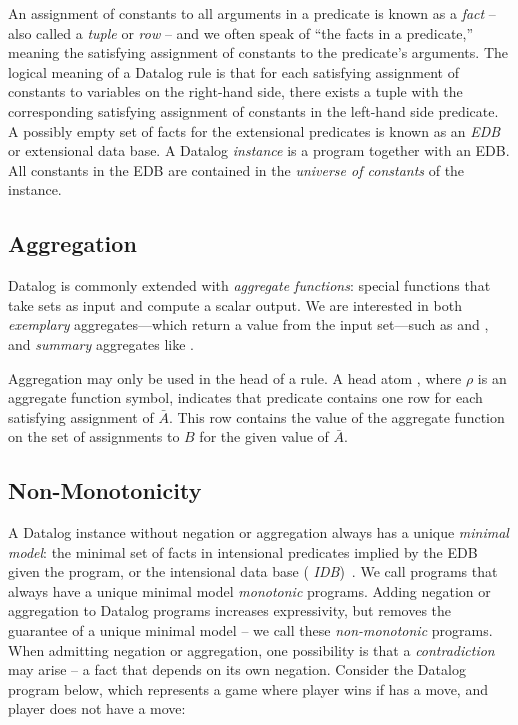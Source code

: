 An assignment of constants to all arguments in a predicate is known as a {\em
fact} -- also called a {\em tuple} or {\em row} -- and we often speak of ``the
facts in a predicate,'' meaning the satisfying assignment of constants to the
predicate's arguments.  The logical meaning of a Datalog rule is that for each
satisfying assignment of constants to variables on the right-hand side, there
exists a tuple with the corresponding satisfying assignment of constants in the
left-hand side predicate.
A possibly empty set of facts for the extensional predicates is known as an
{\em EDB} or extensional data base.  A Datalog {\em instance} is a program
together with an EDB.  All constants in the EDB are contained in the {\em
universe of constants} of the instance.

\subsection{Aggregation}

Datalog is commonly extended with {\em aggregate functions}: special functions
that take sets as input and compute a scalar output.
We are interested in both {\em exemplary} aggregates---which return a value
from the input set---such as  and , and {\em summary}
aggregates like .

Aggregation may only be used in the head of a rule.  A head atom
, where $\rho$ is an aggregate function symbol,
indicates that predicate  contains one row for each satisfying
assignment of $\bar{A}$.  This row contains the value of the aggregate function
on the set of assignments to $B$ for the given value of $\bar{A}$.

\subsection{Non-Monotonicity}

A Datalog instance without negation or aggregation always has a unique {\em
minimal model}: the minimal set of facts in intensional predicates implied by
the EDB given the program, or the intensional data base ({\em
IDB})~\cite{ullmanbook}.  We call programs that always have a unique minimal
model {\em monotonic} programs.  Adding negation or aggregation to Datalog
programs increases expressivity, but removes the guarantee of a
unique minimal model -- we call these {\em non-monotonic} programs.  When
admitting negation or aggregation, one possibility is that a {\em
contradiction} may arise -- a fact that depends on its own negation.  Consider
the Datalog program below, which represents a game where player 
wins if has a move, and player  does not have a move:

